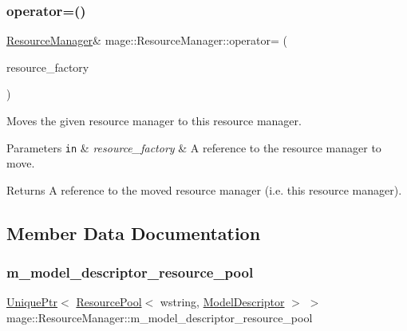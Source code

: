 \subsubsection{\texorpdfstring{operator=()}{operator=()}\hspace{0.1cm}{\footnotesize\ttfamily [2/2]}}
{\footnotesize\ttfamily \hyperlink{classmage_1_1_resource_manager}{Resource\+Manager}\& mage\+::\+Resource\+Manager\+::operator= (\begin{DoxyParamCaption}\item[{\hyperlink{classmage_1_1_resource_manager}{Resource\+Manager} \&\&}]{resource\+\_\+factory }\end{DoxyParamCaption})\hspace{0.3cm}{\ttfamily [delete]}}

Moves the given resource manager to this resource manager.


\begin{DoxyParams}[1]{Parameters}
\mbox{\tt in}  & {\em resource\+\_\+factory} & A reference to the resource manager to move. \\
\hline
\end{DoxyParams}
\begin{DoxyReturn}{Returns}
A reference to the moved resource manager (i.\+e. this resource manager). 
\end{DoxyReturn}


\subsection{Member Data Documentation}
\hypertarget{classmage_1_1_resource_manager_a26991ee1ef428871c8c7e1464613a36a}{}\label{classmage_1_1_resource_manager_a26991ee1ef428871c8c7e1464613a36a} 
\subsubsection{\texorpdfstring{m\+\_\+model\+\_\+descriptor\+\_\+resource\+\_\+pool}{m\_model\_descriptor\_resource\_pool}}
{\footnotesize\ttfamily \hyperlink{namespacemage_a8c307fbcc33bce9b7f2aa4c26c3b95cf}{Unique\+Ptr}$<$ \hyperlink{classmage_1_1_resource_pool}{Resource\+Pool}$<$ wstring, \hyperlink{classmage_1_1_model_descriptor}{Model\+Descriptor} $>$ $>$ mage\+::\+Resource\+Manager\+::m\+\_\+model\+\_\+descriptor\+\_\+resource\+\_\+pool\hspace{0.3cm}{\ttfamily [private]}}


